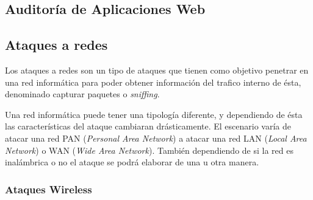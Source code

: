 {\color{red}

\subsection{Auditoría de Aplicaciones Web}



\subsection{Ataques a redes}

Los ataques a redes son un tipo de ataques que tienen como objetivo penetrar en una red informática para poder obtener información del trafico interno de ésta, denominado capturar paquetes o \textit{sniffing}.

Una red informática puede tener una tipología diferente, y dependiendo de ésta las características del ataque cambiaran drásticamente. El escenario varía de atacar una red PAN (\textit{Personal Area Network}) a atacar una red LAN (\textit{Local Area Network}) o WAN (\textit{Wide Area Network}). También dependiendo de si la red es inalámbrica o no el ataque se podrá elaborar de una u otra manera.



\subsubsection{Ataques Wireless}

}